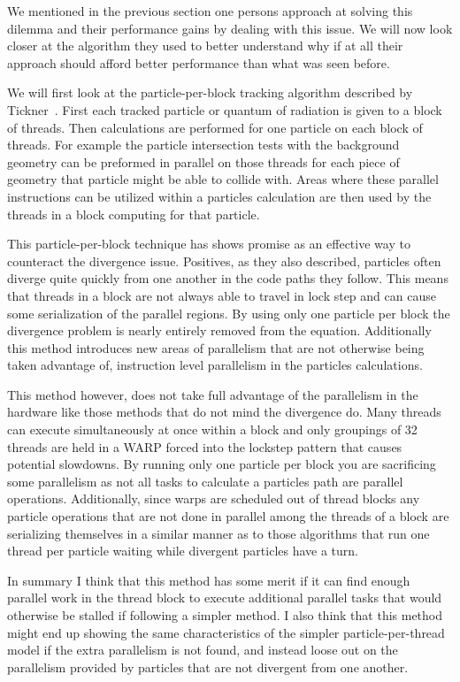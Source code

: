 We mentioned in the previous section one persons approach at solving this dilemma and their performance gains by dealing with this issue.
%
We will now look closer at the algorithm they used to better understand why if at all their approach should afford better performance than what was seen before.
%

We will first look at the particle-per-block tracking algorithm described by Tickner~\cite{tickner2010monte}.
%
First each tracked particle or quantum of radiation is given to a block of threads.
%
Then calculations are performed for one particle on each block of threads.
%
For example the particle intersection tests with the background geometry can be preformed in parallel on those threads for each piece of geometry that particle might be able to collide with.
%
Areas where these parallel instructions can be utilized within a particles calculation are then used by the threads in a block computing for that particle.
%

This particle-per-block technique has shows promise as an effective way to counteract the divergence issue.
%
Positives, as they also described, particles often diverge quite quickly from one another in the code paths they follow.
%
This means that threads in a block are not always able to travel in lock step and can cause some serialization of the parallel regions.
%
By using only one particle per block the divergence problem is nearly entirely removed from the equation.
%
Additionally this method introduces new areas of parallelism that are not otherwise being taken advantage of, instruction level parallelism in the particles calculations.
%

%
This method however, does not take full advantage of the parallelism in the hardware like those methods that do not mind the divergence do.
%
Many threads can execute simultaneously at once within a block and only groupings of 32 threads are held in a WARP forced into the lockstep pattern that causes potential slowdowns.
%
By running only one particle per block you are sacrificing some parallelism as not all tasks to calculate a particles path are parallel operations.
%
Additionally, since warps are scheduled out of thread blocks any particle operations that are not done in parallel among the threads of a block are serializing themselves in a similar manner as to those algorithms that run one thread per particle waiting while divergent particles have a turn.
%

In summary I think that this method has some merit if it can find enough parallel work in the thread block to execute additional parallel tasks that would otherwise be stalled if following a simpler method.
%
I also think that this method might end up showing the same characteristics of the simpler particle-per-thread model if the extra parallelism is not found, and instead loose out on the parallelism provided by particles that are not divergent from one another. 


